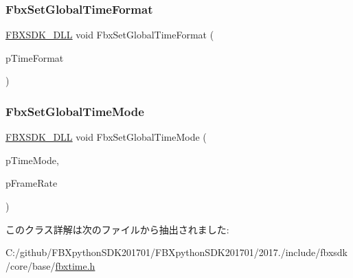 \mbox{\label{class_fbx_time_a765fa4f060e2aaca17ba5d41ddb72b1f}} 
\subsubsection{\texorpdfstring{Fbx\+Set\+Global\+Time\+Format}{FbxSetGlobalTimeFormat}}
{\footnotesize\ttfamily \hyperlink{fbxarch_8h_a25d1298b33c31da5dbed969e0d4b4bc1}{F\+B\+X\+S\+D\+K\+\_\+\+D\+LL} void Fbx\+Set\+Global\+Time\+Format (\begin{DoxyParamCaption}\item[{\hyperlink{class_fbx_time_a10ffa1fdce0aa7f63ec24bdd23afff4b}{Fbx\+Time\+::\+E\+Protocol}}]{p\+Time\+Format }\end{DoxyParamCaption})\hspace{0.3cm}{\ttfamily [friend]}}

\mbox{\label{class_fbx_time_a8d274550abe4c6890b2fa0da734f6530}} 
\subsubsection{\texorpdfstring{Fbx\+Set\+Global\+Time\+Mode}{FbxSetGlobalTimeMode}}
{\footnotesize\ttfamily \hyperlink{fbxarch_8h_a25d1298b33c31da5dbed969e0d4b4bc1}{F\+B\+X\+S\+D\+K\+\_\+\+D\+LL} void Fbx\+Set\+Global\+Time\+Mode (\begin{DoxyParamCaption}\item[{\hyperlink{class_fbx_time_acc529b00a0e8d4c3da3702449ca93031}{Fbx\+Time\+::\+E\+Mode}}]{p\+Time\+Mode,  }\item[{double}]{p\+Frame\+Rate }\end{DoxyParamCaption})\hspace{0.3cm}{\ttfamily [friend]}}



このクラス詳解は次のファイルから抽出されました\+:\begin{DoxyCompactItemize}
\item 
C\+:/github/\+F\+B\+Xpython\+S\+D\+K201701/\+F\+B\+Xpython\+S\+D\+K201701/2017./include/fbxsdk/core/base/\hyperlink{fbxtime_8h}{fbxtime.\+h}\end{DoxyCompactItemize}
